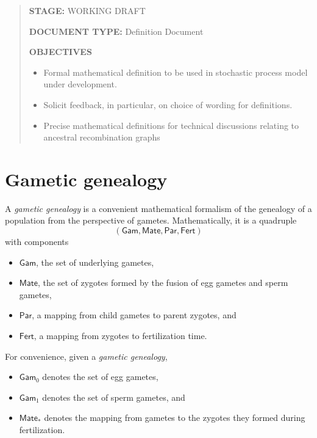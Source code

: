 \documentclass{article}
\begin{document}
\newcommand{\mathstop}{\text{ .}}
\newcommand{\dom}{\operatorname{dom}}
\newcommand{\rng}{\operatorname{rng}}
\newcommand{\Gam}{\mathsf{Gam}}
\newcommand{\Mate}{\mathsf{Mate}}
\newcommand{\Par}{\mathsf{Par}}
\newcommand{\Fert}{\mathsf{Fert}}
\newcommand{\Loc}{\mathsf{Loc}}
\newcommand{\Lin}{\mathsf{Lin}}
\newcommand{\Leg}{\mathsf{Leg}}
\newcommand{\Nodes}{\mathsf{Nodes}}


\begin{abstract}
\textbf{STAGE:} WORKING DRAFT

\textbf{DOCUMENT TYPE:} Definition Document

\textbf{OBJECTIVES}

\begin{itemize}
\item
  Formal mathematical definition to be used in stochastic process model
  under development.
\item
  Solicit feedback, in particular, on choice of wording for definitions.
\item
  Precise mathematical definitions for technical discussions relating to
  ancestral recombination graphs
\end{itemize}
\end{abstract}


\section{Gametic genealogy}

A \emph{gametic genealogy} is a convenient mathematical formalism of the
genealogy of a population from the perspective of gametes.
Mathematically, it is a quadruple \[
(\Gam, \Mate, \Par, \Fert) 
\] with components

\begin{itemize}
\item
  \(\Gam\), the set of underlying gametes,
\item
  \(\Mate\), the set of zygotes formed by the fusion of egg gametes and
  sperm gametes,
\item
  \(\Par\), a mapping from child gametes to parent zygotes, and
\item
  \(\Fert\), a mapping from zygotes to fertilization time.
\end{itemize}

For convenience, given a \emph{gametic genealogy},

\begin{itemize}
\item
  \(\Gam_0\) denotes the set of egg gametes,
\item
  \(\Gam_1\) denotes the set of sperm gametes, and
\item
  \(\Mate_*\) denotes the mapping from gametes to the zygotes they
  formed during fertilization.
\end{itemize}
\end{document}
